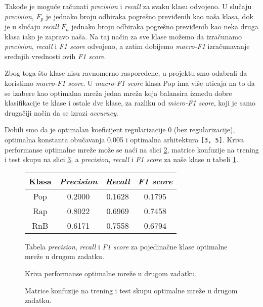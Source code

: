 \documentclass[10pt,a4paper,titlepage,croatian]{article}
\begin{document}
Takođe je moguće računati \textit{precision} i \textit{recall} za svaku klasu odvojeno. U slučaju \textit{precision}, $F_p$ je jednako broju odbiraka pogrešno previđenih kao naša klasa, dok je u slučaju \textit{recall} $F_n$ jednako broju odbiraka pogrešno previđenih kao neka druga klasa iako je zapravo naša. Na taj način za sve klase možemo da izračunamo \textit{precision}, \textit{recall} i \textit{F1 score} odvojeno, a zatim dobijemo \textit{macro-F1} izračunavanje srednjih vrednosti ovih \textit{F1 score}.

Zbog toga što klase nisu ravnomerno raspoređene, u projektu smo odabrali da koristimo \textit{macro-F1 score}. U \textit{macro-F1 score} klasa Pop ima više uticaja na to da se izabere kao optimalna mreža jedna mreža koja balansira između dobre klasifikacije te klase i ostale dve klase, za razliku od \textit{micro-F1 score}, koji je samo drugačiji način da se izrazi \textit{accuracy}.

Dobili smo da je optimalan koeficijent regularizacije 0 (bez regularizacije), optimalna konstanta obučavanja 0.005 i optimalna arhitektura \texttt{[3, 5]}. Kriva performanse optimalne mreže može se naći na slici \ref{Performance2}, matrice konfuzije na trening i test skupu na slici \ref{CM2}, a \textit{precision}, \textit{recall} i \textit{F1 score} za naše klase u tabeli \ref{Data2}.

\begin{figure}[H]
    \centering
    \begin{tabular}{ |c|c|c|c| }
        \hline
        Klasa & \textit{Precision} & \textit{Recall} & \textit{F1 score} \\
        \hline
        Pop & 0.2000 & 0.1628 & 0.1795 \\
        \hline
        Rap & 0.8022 & 0.6969 & 0.7458 \\
        \hline
        RnB & 0.6171 & 0.7558 & 0.6794 \\
        \hline
    \end{tabular}
    \caption{Tabela \textit{precision}, \textit{recall} i \textit{F1 score} za pojedinačne klase optimalne mreže u drugom zadatku.}
    \label{Data2}
\end{figure}
\begin{figure}[H]
    \centering
    
    \caption{Kriva performanse optimalne mreže u drugom zadatku.}
    \label{Performance2}
\end{figure}
\begin{figure}[H]
    \centering
    
    
    \caption{Matrice konfuzije na trening i test skupu optimalne mreže u drugom zadatku.}
    \label{CM2}
\end{figure}
\end{document}
